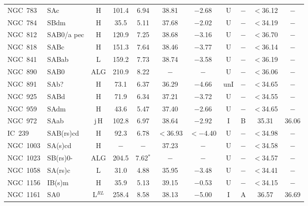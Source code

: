 \begin{center}
\begin{longtable}{lC{2.5cm}ccccccccc}
NGC~783   & SAc      & H        & 101.4 & 6.94        & 38.81    & $-$2.68    & U & $-$    & $<$36.12  & $-$     \\
NGC~784   & SBdm    &  H      &  35.5   & 5.11       & 37.68    & $-$2.02   &  U & $-$    &  $<$34.19  & $-$  \\
NGC~812   & SAB0/a pec &  H  &  120.9  &  7.25   & 38.68  & $-$3.16    &   U & $-$    &  $<$36.70  & $-$  \\
NGC~818   & SABc     &      H  &   151.3   & 7.64    & 38.46  & $-$3.77   &   U  & $-$     &  $<$36.14  & $-$ \\
NGC~841   & SABab   &  L      &  159.2     & 7.73    & 38.74  & $-$3.58   &    U & $-$     &  $<$36.19  & $-$ \\
NGC~890   & SAB0    &  ALG   &  210.9    &  8.22   &    $-$    &  $-$      &   U & $-$     &   $<$36.06   & $-$  \\
NGC~891   & SAb?     &  H      &  73.1      & 6.37     &  36.29  & $-$4.66  & unI &  $-$   & $<$34.65   &  $-$ \\
NGC~925   & SABd     &  H     &  71.9      &  6.34     &  37.21  &  $-$3.72  & U & $-$ &  $<$34.55  &  $-$   \\
NGC~959   & SAdm   &   H    &   43.6     &  5.47     &  37.40   & $-$2.66  &  U &  $-$ &  $<$34.65  &  $-$   \\
NGC~972   & SAab     &  j\,H    &   102.8   & 6.97     &  38.64    &  $-$2.92  & I   & B      &  35.31  &  36.06   \\
IC~239       & SAB(rs)cd    & H        & 92.3  & 6.78            & $<$36.93    & $<-$4.40 & U &$-$      & $<$34.98 &  $-$         \\
NGC~1003 & SA(s)cd       & H        & $-$       & $-$                 & 37.23        & $-$               & U &$-$      & $<$34.58 & $-$               \\
NGC~1023 & SB(rs)0-      &  ALG     & 204.5 & 7.62$^{*}$      & $-$      & $-$      & U &$-$      & $<$34.57 & $-$          \\
NGC~1058 & SA(rs)c        & L              & 31.0    & 4.88            & 35.95    & $-$3.48 & U  & $-$    & $<$34.41  &  $-$             \\
NGC~1156  & IB(s)m         & H              & 35.9  & 5.13            & 39.15    & $-$0.53  & U &$-$     & $<$34.15 &  $-$         \\
NGC~1161  & SA0             &  L$^{RL}$              & 258.4 & 8.58            & 38.13    & $-$5.00  &  I  & A      & 36.57    & 36.69         \\

\end{longtable}
\end{center}

